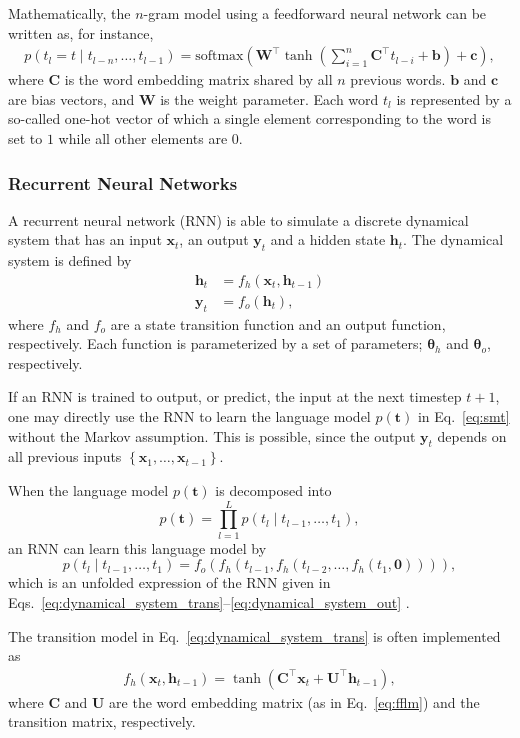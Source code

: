 \documentclass[11pt, oneside]{essay}
\newcommand{\softmax}{\text{softmax}}
\newcommand{\vect}[1]{\mathbf{#1}}
\newcommand{\vects}[1]{\boldsymbol{#1}}
\newcommand{\matr}[1]{\mathbf{#1}}
\newcommand{\vb}[0]{\vect{b}}
\newcommand{\vc}[0]{\vect{c}}
\newcommand{\vh}[0]{\vect{h}}
\newcommand{\vx}[0]{\vect{x}}
\newcommand{\vy}[0]{\vect{y}}
\newcommand{\vt}[0]{\vect{t}}
\newcommand{\mW}[0]{\matr{W}}
\newcommand{\mU}[0]{\matr{U}}
\newcommand{\mC}{\matr{C}}
\newcommand{\vzero}[0]{\vect{0}}
\newcommand{\TT}[0]{{\vects{\theta}}}
\begin{document}
Mathematically, the $n$-gram model using a feedforward neural
network can be written as, for instance, 
\begin{align}
\label{eq:fflm}
    p(t_l =t \mid t_{l-n}, \dots, t_{l-1}) = \softmax
    \left( \mW^\top \tanh\left(\sum_{i=1}^n \mC^\top t_{l-i} +
    \vb\right) +\vc
    \right),
\end{align}
where $\mC$ is the word embedding matrix shared by all $n$
previous words. $\vb$ and $\vc$ are bias vectors, and $\mW$ is
the weight parameter. Each word $t_l$ is represented by a
so-called one-hot vector of which a single element corresponding
to the word is set to $1$ while all other elements are $0$.

\subsubsection{Recurrent Neural Networks}

A recurrent neural network (RNN) is able to simulate a discrete
dynamical system that has an input $\vx_t$, an output $\vy_t$ and
a hidden state $\vh_t$.  The dynamical system is defined by
\begin{align}
    \label{eq:dynamical_system_trans}
    \vh_t &= f_h(\vx_t, \vh_{t-1}) 
    \\
    \label{eq:dynamical_system_out}
    \vy_t &= f_o(\vh_t),
\end{align}
where $f_h$ and $f_o$ are a state transition function and an
output function, respectively. Each function is parameterized by
a set of parameters; $\TT_h$ and $\TT_o$, respectively. 

If an RNN is trained to output, or predict, the input at the next
timestep $t+1$, one may directly use the RNN to learn the
language model $p(\vt)$ in Eq.~\eqref{eq:smt} without the Markov
assumption. This is possible, since the output $\vy_t$ depends on
all previous inputs $\left\{ \vx_1, \dots, \vx_{t-1} \right\}$.

When the language model $p(\vt)$ is decomposed into
\[
    p(\vt) = \prod_{l=1}^L p(t_l \mid t_{l-1}, \dots, t_1),
\]
an RNN can learn this language model by 
\[
    p(t_l \mid t_{l-1}, \dots, t_1) = f_o(f_h(t_{l-1},
    f_h(t_{l-2}, \dots, f_h(t_1, \vzero)))),
\]
which is an unfolded expression of the RNN given in
Eqs.~\eqref{eq:dynamical_system_trans}--\eqref{eq:dynamical_system_out}
\citep{Mikolov2010}.

The transition model in Eq.~\eqref{eq:dynamical_system_trans} is
often implemented as
\begin{align}
\label{eq:rnn_simple_trans}
f_h(\vx_t, \vh_{t-1}) = \tanh\left( \mC^\top \vx_t + \mU^\top
        \vh_{t-1}\right),
\end{align}
where $\mC$ and $\mU$ are the word embedding matrix (as in
Eq.~\eqref{eq:fflm}) and the transition matrix, respectively.
\end{document}
